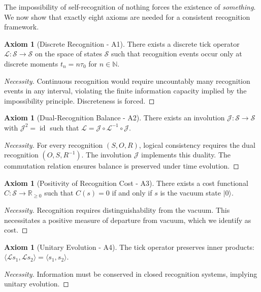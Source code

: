 \documentclass[12pt]{article}
\theoremstyle{definition}
\newtheorem{axiom}[theorem]{Axiom}
\theoremstyle{remark}
\newcommand{\R}{\mathbb{R}}
\newcommand{\N}{\mathbb{N}}
\DeclareMathOperator{\id}{id}
\newcommand{\inner}[2]{\langle #1, #2 \rangle}
\newcommand{\tick}{\mathcal{L}}
\newcommand{\dual}{\mathcal{J}}
\begin{document}
The impossibility of self-recognition of nothing forces the existence of \emph{something}. We now show that exactly eight axioms are needed for a consistent recognition framework.

\begin{axiom}[Discrete Recognition - A1]
There exists a discrete tick operator $\tick: \mathcal{S} \to \mathcal{S}$ on the space of states $\mathcal{S}$ such that recognition events occur only at discrete moments $t_n = n\tau_0$ for $n \in \N$.
\end{axiom}

\begin{proof}[Necessity]
Continuous recognition would require uncountably many recognition events in any interval, violating the finite information capacity implied by the impossibility principle. Discreteness is forced.
\end{proof}

\begin{axiom}[Dual-Recognition Balance - A2]
There exists an involution $\dual: \mathcal{S} \to \mathcal{S}$ with $\dual^2 = \id$ such that $\tick = \dual \circ \tick^{-1} \circ \dual$.
\end{axiom}

\begin{proof}[Necessity]
For every recognition $(S, O, R)$, logical consistency requires the dual recognition $(O, S, R^{-1})$. The involution $\dual$ implements this duality. The commutation relation ensures balance is preserved under time evolution.
\end{proof}

\begin{axiom}[Positivity of Recognition Cost - A3]
There exists a cost functional $C: \mathcal{S} \to \R_{\geq 0}$ such that $C(s) = 0$ if and only if $s$ is the vacuum state $|0\rangle$.
\end{axiom}

\begin{proof}[Necessity]
Recognition requires distinguishability from the vacuum. This necessitates a positive measure of departure from vacuum, which we identify as cost.
\end{proof}

\begin{axiom}[Unitary Evolution - A4]
The tick operator preserves inner products: $\inner{\tick s_1}{\tick s_2} = \inner{s_1}{s_2}$.
\end{axiom}

\begin{proof}[Necessity]
Information must be conserved in closed recognition systems, implying unitary evolution.
\end{proof}
\end{document}
